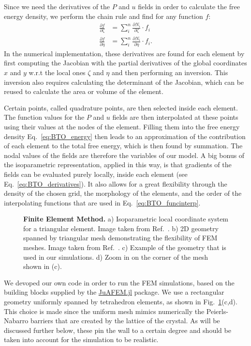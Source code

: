 Since we need the derivatives of the $P$ and $u$ fields in order to calculate the free energy density, we perform the chain rule and find for any function $f$:
\begin{align}
	\label{eq:BTO_derivatives}
	\frac{\partial f}{\partial \zeta} &= \sum_i^n \frac{\partial N_i}{\partial \zeta} \cdot f_i \\
	\frac{\partial f}{\partial \eta}  &= \sum_i^n \frac{\partial N_i}{\partial \eta} \cdot f_i.
\end{align}
In the numerical implementation, these derivatives are found for each element by first computing the Jacobian with the partial derivatives of the global coordinates $x$ and $y$ w.r.t the local ones $\zeta$ and $\eta$ and then performing an inversion.
This inversion also requires calculating the determinant of the Jacobian, which can be reused to calculate the area or volume of the element.

Certain points, called quadrature points, are then selected inside each element.
The function values for the $P$ and $u$ fields are then interpolated at these points using their values at the nodes of the element.
Filling them into the free energy density Eq.~\ref{eq:BTO_energy} then leads to an approximation of the contribution of each element to the total free energy, which is then found by summation. 
The nodal values of the fields are therefore the variables of our model. 
A big bonus of the isoparametric representation, applied in this way, is that gradients of the fields can be evaluated purely locally, inside each element (see Eq.~\ref{eq:BTO_derivatives}).
It also allows for a great flexibility through the density of the chosen grid, the morphology of the elements, and the order of the interpolating functions that are used in Eq.~\ref{eq:BTO_funcinterp}.

\begin{figure}[h!]
	\caption{\label{fig:BTO_fem}{\bf Finite Element Method.} a) Isoparametric local coordinate system for a triangular element. Image taken from Ref.~\cite{Biner}. b) 2D geometry spanned by triangular mesh demonstrating the flexibility of FEM meshes. Image taken from Ref.~\cite{2Dmesh}. c) Example of the geometry that is used in our simulations. d) Zoom in on the corner of the mesh shown in (c).}
\end{figure}

We devoped our own code in order to run the FEM simulations, based on the building blocks supplied by the \href{https://github.com/KristofferC/JuAFEM.jl}{JuAFEM.jl} package.
We use a rectangular geometry uniformly spanned by tetrahedron elements, as shown in Fig.~\ref{fig:BTO_fem}(c,d).
This choice is made since the uniform mesh mimics numerically the Peierls-Nabarro barriers that are created by the lattice of the crystal.
As will be discussed further below, these pin the wall to a certain degree and should be taken into account for the simulation to be realistic.

